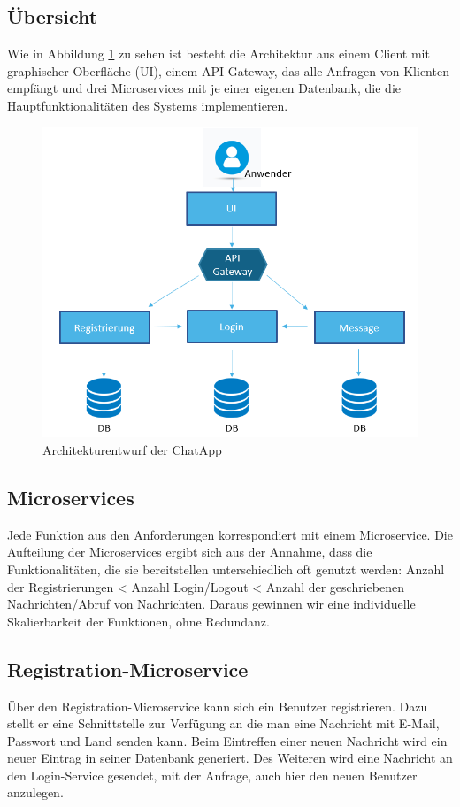 \subsection{Übersicht}
Wie in Abbildung \ref{entwurf} zu sehen ist besteht die Architektur aus einem Client mit graphischer Oberfläche (UI), einem API-Gateway, das alle Anfragen von Klienten empfängt und drei Microservices mit je einer eigenen Datenbank, die die Hauptfunktionalitäten des Systems implementieren.\newpage
\begin{figure}[bth] 
	\centering
	\includegraphics[width=1.0\textwidth]{Graphics/Architekturentwurf.png}
	\caption{Architekturentwurf der ChatApp}
	\label{entwurf}
\end{figure}
\subsection{Microservices}
Jede Funktion aus den Anforderungen korrespondiert mit einem Microservice. Die Aufteilung der Microservices ergibt sich aus der Annahme, dass die Funktionalitäten, die sie bereitstellen unterschiedlich oft genutzt werden: Anzahl der Registrierungen < Anzahl Login/Logout < Anzahl der geschriebenen Nachrichten/Abruf von Nachrichten. Daraus gewinnen wir eine individuelle Skalierbarkeit der Funktionen, ohne Redundanz.

\subsection{Registration-Microservice}
Über den Registration-Microservice kann sich ein Benutzer registrieren. Dazu stellt er eine Schnittstelle zur Verfügung an die man eine Nachricht mit E-Mail, Passwort und Land senden kann. Beim Eintreffen einer neuen Nachricht wird ein neuer Eintrag in seiner Datenbank generiert. Des Weiteren wird eine Nachricht an den Login-Service gesendet, mit der Anfrage, auch hier den neuen Benutzer anzulegen.


